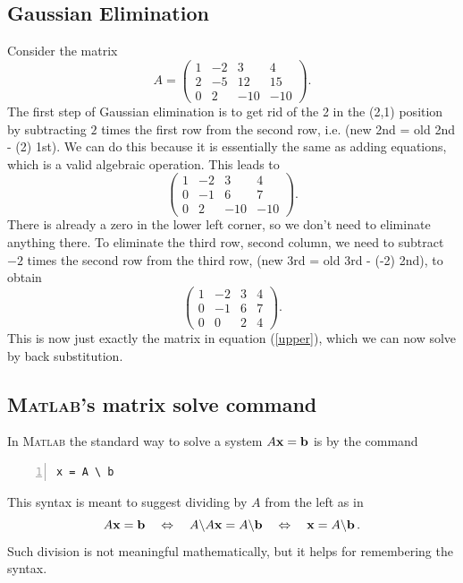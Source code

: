 
\subsection*{Gaussian Elimination}

Consider the matrix
$$
 A = \left(\begin{array}{ccc|c}
        1 & -2 & 3  &  4 \\
        2 & -5 & 12 & 15 \\
        0 & 2 & -10 & -10
      \end{array}\right).
$$
The first step of Gaussian elimination is to get rid of the 2 in
the (2,1) position by subtracting $2$ times the first row
from the second row, i.e. {\sf (new 2nd = old 2nd - (2) 1st)}.
We can do this because it is essentially the
same as adding equations, which is a valid
algebraic operation.  This leads to
$$
\left(\begin{array}{ccc|c}
        1 & -2 & 3 & 4 \\
        0 & -1 & 6 & 7 \\
        0 & 2 & -10 & -10
      \end{array}\right).
$$
There is already a zero in the lower left corner, so we don't need to
eliminate anything there. To eliminate the third row, second column,
we need to subtract $-2$ times the second row from the third row, {\sf
  (new 3rd = old 3rd - (-2) 2nd)}, to obtain
$$
\left(\begin{array}{ccc|c}
        1 & -2 & 3 &  4 \\
        0 & -1 & 6 &  7 \\
        0 &  0 & 2 &  4
      \end{array}\right).
$$
This is now just exactly the matrix in equation (\ref{upper}), which
we can now solve by back substitution.



\subsection*{\textsc{Matlab}'s matrix solve command}

In \textsc{Matlab} the standard way to solve a system $A \mathbf{x} = \mathbf{b}$
is by the command
\begin{lstlisting}[frame=none,numbers=left]
x = A \ b
\end{lstlisting}
This syntax is meant to suggest dividing by \(A\) from the left as in
\[A \mathbf{x} = \mathbf{b} \quad \Leftrightarrow\quad A\backslash A \mathbf{x} = A\backslash \mathbf{b} 
\quad \Leftrightarrow\quad  \mathbf{x} = A\backslash \mathbf{b}
\,.\]
Such division is not meaningful mathematically, but it helps for remembering the syntax.


